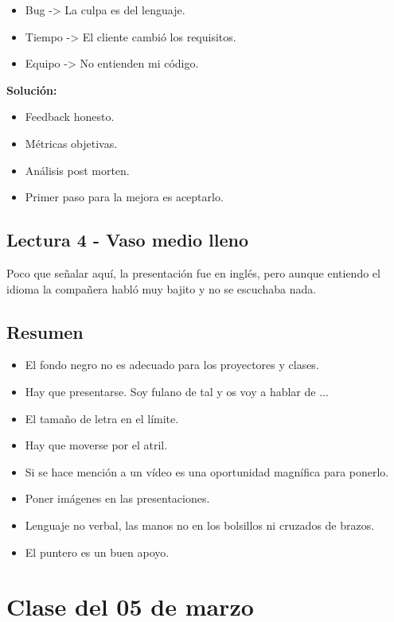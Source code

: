 \documentclass[12pt, a4paper, twoside]{article}
\begin{document}
\begin{itemize}
    \item{Bug -> La culpa es del lenguaje.}
    \item{Tiempo -> El cliente cambió los requisitos.}
    \item{Equipo -> No entienden mi código.}
\end{itemize}

\noindent\textbf{Solución:}

\begin{itemize}
    \item{Feedback honesto.}
    \item{Métricas objetivas.}
    \item{Análisis post morten.}
    \item{Primer paso para la mejora es aceptarlo.}
\end{itemize}

\subsection{Lectura 4 - Vaso medio lleno}
Poco que señalar aquí, la presentación fue en inglés, pero aunque entiendo el idioma la 
compañera habló muy bajito y no se escuchaba nada.\\

\subsection{Resumen}
\begin{itemize}
    \item El fondo negro no es adecuado para los proyectores y clases.
    \item Hay que presentarse. Soy fulano de tal y os voy a hablar de ...
    \item El tamaño de letra en el límite.
    \item Hay que moverse por el atril.
    \item Si se hace mención a un vídeo es una oportunidad magnífica para ponerlo.
    \item Poner imágenes en las presentaciones.
    \item Lenguaje no verbal, las manos no en los bolsillos ni cruzados de brazos.
    \item El puntero es un buen apoyo.
    
\end{itemize}

\newpage

\section{Clase del 05 de marzo}
\end{document}
